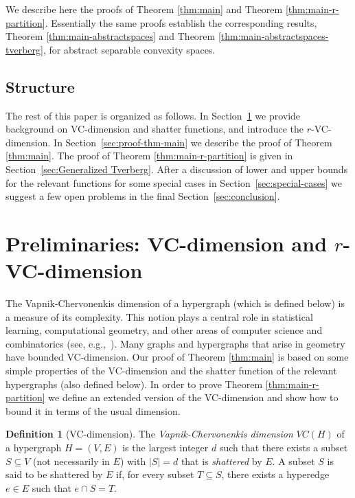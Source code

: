 \documentclass[11pt]{article}
\theoremstyle{plain}
\theoremstyle{definition}
\newtheorem{definition}[theorem]{Definition}
\theoremstyle{remark}
\begin{document}
We describe here the proofs of Theorem \ref{thm:main} and Theorem
\ref{thm:main-r-partition}. Essentially the same proofs establish the corresponding results, Theorem \ref{thm:main-abstractspaces} and Theorem
\ref{thm:main-abstractspaces-tverberg},
for  abstract separable convexity spaces.

 
   
 \subsection{Structure}
The rest of this paper is organized as follows. In Section~\ref{sec:prelim} we provide background on VC-dimension and shatter functions, and introduce the $r$-VC-dimension. In Section~\ref{sec:proof-thm-main} 
we describe the proof of Theorem \ref{thm:main}. The proof of Theorem \ref{thm:main-r-partition} is given in Section~\ref{sec:Generalized Tverberg}. After a discussion of 
lower and upper bounds for the relevant functions for some special
cases in Section~\ref{sec:special-cases} we suggest a few open problems in the final Section~\ref{sec:conclusion}.

\section{Preliminaries: VC-dimension and $r$-VC-dimension}
\label{sec:prelim}
\noindent
The Vapnik-Chervonenkis dimension of a hypergraph (which is defined below) is a measure of
its complexity. This notion plays a central role in statistical learning,
computational geometry, and other areas of computer science and
combinatorics (see, e.g.,~\cite{AHW87,ABKKW2006,AMY17,BEHW89,MV18}).  
Many graphs and
hypergraphs that arise in geometry have bounded VC-dimension.
Our proof of Theorem \ref{thm:main} is based on some simple properties of the VC-dimension and the shatter function of the relevant hypergraphs (also defined below). In order to prove Theorem \ref{thm:main-r-partition} we define an extended version of the VC-dimension and show how to bound it in terms of the usual dimension.
\vspace{0.2cm}

 \begin{definition}[VC-dimension] \label{def:VC-dim} The
 \emph{Vapnik-Chervonenkis dimension} $VC(H)$ of a hypergraph $H = (V, E)$
 is the largest integer $d$ such that there exists a subset $S \subseteq
 V$ (not necessarily in $E$) with $|S| = d$ that is \emph{shattered} by
 $E$. A subset $S$ is said to be shattered by $E$ if, for every subset
 $T \subseteq S$, there exists a hyperedge $e \in E$ such that $e \cap
 S = T$.
\end{definition}
\end{document}
